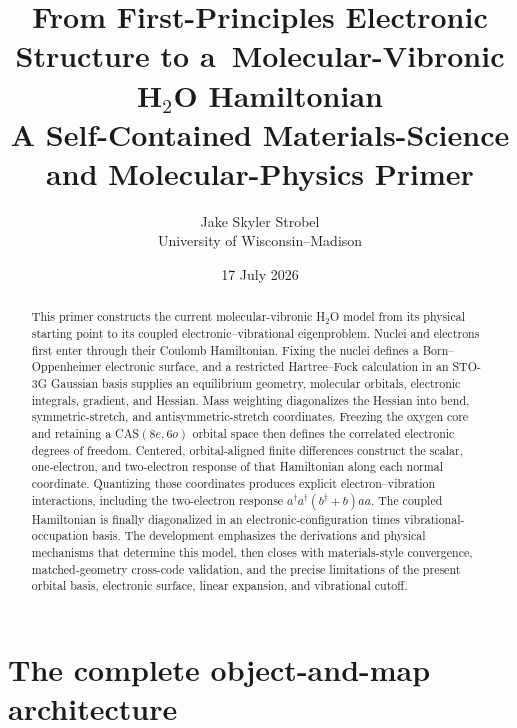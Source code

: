 \documentclass[10pt,twocolumn]{article}
\title{From First-Principles Electronic Structure to a\
Molecular-Vibronic H$_2$O Hamiltonian\\
\large A Self-Contained Materials-Science and Molecular-Physics Primer}
\author{Jake Skyler Strobel\\University of Wisconsin--Madison}
\date{17 July 2026}
\begin{document}
\maketitle
\vspace{-1.45em}

\begin{abstract}
This primer constructs the current molecular-vibronic H$_2$O model from its
physical starting point to its coupled electronic--vibrational eigenproblem.
Nuclei and electrons first enter through their Coulomb Hamiltonian.  Fixing the
nuclei defines a Born--Oppenheimer electronic surface, and a restricted
Hartree--Fock calculation in an STO-3G Gaussian basis supplies an equilibrium
geometry, molecular orbitals, electronic integrals, gradient, and Hessian.
Mass weighting diagonalizes the Hessian into bend, symmetric-stretch, and
antisymmetric-stretch coordinates.  Freezing the oxygen core and retaining a
CAS$(8e,6o)$ orbital space then defines the correlated electronic degrees of
freedom.  Centered, orbital-aligned finite differences construct the scalar,
one-electron, and two-electron response of that Hamiltonian along each normal
coordinate.  Quantizing those coordinates produces explicit
electron--vibration interactions, including the two-electron response
$a^\dagger a^\dagger(b^\dagger+b)aa$.  The coupled Hamiltonian is finally
diagonalized in an electronic-configuration times vibrational-occupation
basis.  The development emphasizes the derivations and physical mechanisms
that determine this model, then closes with materials-style convergence,
matched-geometry cross-code validation, and the precise limitations of the
present orbital basis, electronic surface, linear expansion, and vibrational
cutoff.
\end{abstract}

\section*{The complete object-and-map architecture}
\end{document}
